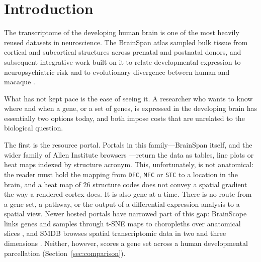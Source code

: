 \documentclass[pdflatex,sn-basic]{sn-jnl}
\begin{document}

\maketitle

\section{Introduction}\label{sec:intro}

The transcriptome of the developing human brain is one of the most heavily
reused datasets in neuroscience. The BrainSpan atlas
\citep{BrainSpan2011,Kang2011,Miller2014} sampled bulk tissue from cortical and
subcortical structures across prenatal and postnatal donors, and subsequent
integrative work built on it to relate developmental expression to
neuropsychiatric risk \citep{Li2018} and to evolutionary divergence between
human and macaque \citep{Zhu2018}.

What has not kept pace is the ease of seeing it. A researcher who wants
to know where and when a gene, or a set of genes, is expressed in the developing
brain has essentially two options today, and both impose costs that are
unrelated to the biological question.

The first is the resource portal. Portals in this family---BrainSpan itself, and
the wider family of Allen Institute browsers \citep{Lau2008,Sunkin2013}---return
the data as tables, line plots or heat maps indexed by structure acronym. This, unfortunately, is 
not anatomical: the reader must hold the mapping from
\texttt{DFC}, \texttt{MFC} or \texttt{STC} to a location in the brain, 
and a heat map of 26 structure codes does not convey a spatial gradient
the way a rendered cortex does. It is also gene-at-a-time. There is no route
from a gene set, a pathway, or the output of a differential-expression analysis
to a spatial view. Newer hosted portals have narrowed part of this gap:
BrainScope links genes and samples through t-SNE maps to choropleths over
anatomical slices \citep{Huisman2017}, and SMDB browses spatial transcriptomic
data in two and three dimensions \citep{Cao2023}. Neither, however, scores a
gene set across a human developmental parcellation
(Section~\ref{sec:comparison}).
\end{document}
